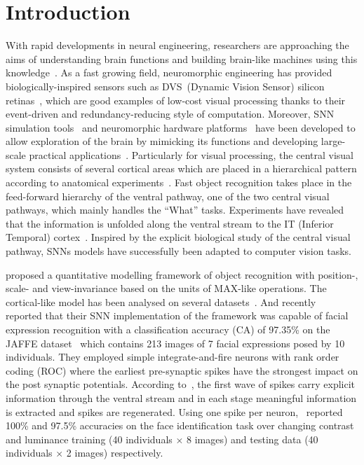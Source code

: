 \documentclass{frontiersENG} %
\begin{document}
\section{Introduction}
\label{sec:intro}
With rapid developments in neural engineering, researchers are approaching the aims of understanding brain functions and building brain-like machines using this knowledge~\citep{furber2007neural}.
As a fast growing field, neuromorphic engineering has provided biologically-inspired sensors such as DVS~(Dynamic Vision Sensor) silicon retinas~\citep{serrano2013128, delbruck2008frame, yang2015dynamic, posch2014retinomorphic}, which are good examples of low-cost visual processing thanks to their event-driven and redundancy-reducing style of computation.
Moreover, SNN simulation tools~\citep{davison2008pynn, gewaltig2007nest, goodman2008brian} and neuromorphic hardware platforms~\citep{furber2014spinnaker,  schemmel2010wafer, merolla2014million} have been developed to allow exploration of the brain by mimicking its functions and developing large-scale practical applications~\citep{eliasmith2012large}.
Particularly for visual processing, the central visual system consists of several cortical areas which are placed in a hierarchical pattern according to anatomical experiments~\citep{felleman1991distributed}.
Fast object recognition takes place in  the feed-forward hierarchy of the ventral pathway, one of the two central visual pathways, which mainly handles the ``What'' tasks.
Experiments have revealed that the information is unfolded along the ventral stream to the  IT (Inferior Temporal) cortex~\citep{dicarlo2012does}.
Inspired by the  explicit  biological study of the central visual pathway, SNNs models have successfully been adapted to computer vision tasks.  

\cite{riesenhuber1999hierarchical} proposed a quantitative modelling framework of object recognition with position-, scale- and view-invariance based on the units of MAX-like operations.
The cortical-like model has been analysed on several datasets~\citep{serre2007robust}.
And recently~\cite{fu2012spiking} reported that their SNN implementation of the framework was capable of facial expression recognition with a classification accuracy (CA) of 97.35\% on the JAFFE dataset~\citep{lyons1998coding} which contains 213 images of 7 facial expressions posed by 10 individuals.
They employed simple integrate-and-fire neurons with rank order coding (ROC) where  the earliest pre-synaptic spikes have the strongest impact on the post synaptic potentials.
According to~\cite{vanrullen2002surfing}, the first wave of spikes  carry explicit information through the ventral stream and in each stage meaningful information is extracted and spikes are regenerated. 
Using one spike per neuron,~\cite{delorme2001face} reported 100\% and 97.5\% accuracies on the face identification task over changing  contrast and luminance training (40 individuals $\times$ 8 images) and testing data (40 individuals $\times$ 2 images) respectively.
\end{document}
